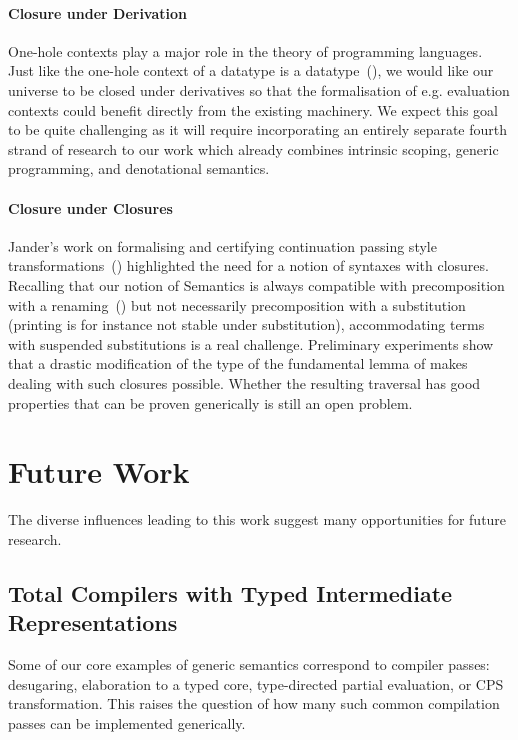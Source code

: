 \paragraph{Closure under Derivation} One-hole contexts play a major role in the
theory of programming languages.
Just like the one-hole context of a datatype is
a datatype~(\cite{DBLP:journals/fuin/AbbottAMG05}), we would like our universe
to be closed under derivatives so that the formalisation of e.g. evaluation
contexts could benefit directly from the existing machinery.
%
We expect this goal to be quite challenging as it will require incorporating
an entirely separate fourth strand of research to our work which already combines
intrinsic scoping, generic programming, and denotational semantics.

\paragraph{Closure under Closures} Jander's work on formalising and certifying
continuation passing style transformations~(\cite{Jander:Thesis:2019})
highlighted the need for a notion of syntaxes with closures. Recalling
that our notion of Semantics is always compatible with precomposition
with a renaming~(\cite{Kaiser-wsdebr}) but not necessarily
precomposition with a substitution (printing is for instance not
stable under substitution), accommodating terms with suspended
substitutions is a real challenge. Preliminary experiments show that a
drastic modification of the type of the fundamental lemma of
 makes dealing with such closures possible. Whether the
resulting traversal has good properties that can be proven generically
is still an open problem.

\section{Future Work}

The diverse influences leading to this work suggest many opportunities
for future research.

\subsection{Total Compilers with Typed Intermediate Representations}

Some of our core examples of generic semantics correspond to compiler passes:
desugaring, elaboration to a typed core, type-directed partial evaluation,
or CPS transformation. This raises the question of how many such common
compilation passes can be implemented generically.

